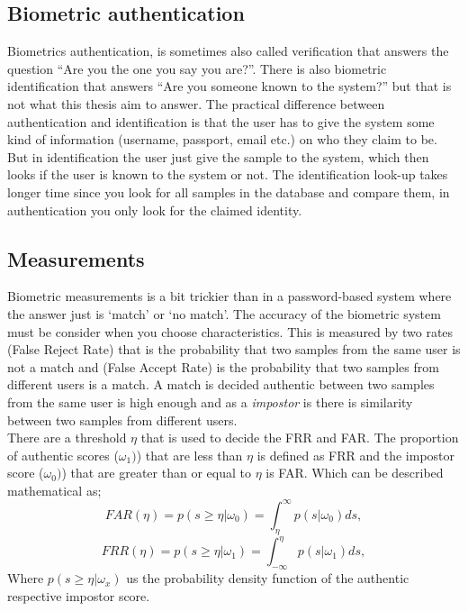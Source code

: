 \subsection{Biometric authentication}
Biometrics authentication, is sometimes also called verification that answers the question ``Are you the one you say you are?''. There is also biometric identification that answers ``Are you someone known to the system?'' but that is not what this thesis aim to answer. The practical difference between authentication and identification is that the user has to give the system some kind of information (username, passport, email etc.) on who they claim to be. But in identification the user just give the sample to the system, which then looks if the user is known to the system or not. The identification look-up takes longer time since you look for all samples in the database and compare them, in authentication you only look for the claimed identity. \cite[ch.~1]{introbio}

\subsection{Measurements}\label{sec:bio:measure}
Biometric measurements is a bit trickier than in a password-based system where the answer just is `match' or `no match'. The accuracy of the biometric system must be consider when you choose characteristics. This is measured by two rates  (False Reject Rate) that is the probability that two samples from the same user is not a match and  (False Accept Rate) is the probability that two samples from different users is a match. A match is decided authentic between two samples from the same user is high enough and as a \textit{impostor} is there is similarity between two samples from different users.  \\
There are a threshold $\eta$ that is used to decide the FRR and FAR. The proportion of authentic scores ($\omega_{1})$) that are less than $\eta$ is defined as FRR and the impostor score ($\omega_{0})$) that are greater than or equal to $\eta$ is FAR. Which can be described mathematical as; 
$$ FAR(\eta) = p(s\geq \eta | \omega_{0}) = \int_{\eta}^{\infty} p(s | \omega_{0}) ds, $$
$$ FRR(\eta) = p(s\geq \eta | \omega_{1}) = \int_{-\infty}^{\eta} p(s | \omega_{1}) ds, $$
Where $p(s\geq \eta | \omega_{x})$ us the probability density function of the authentic respective impostor score. 
\cite[p.~18]{introbio}

